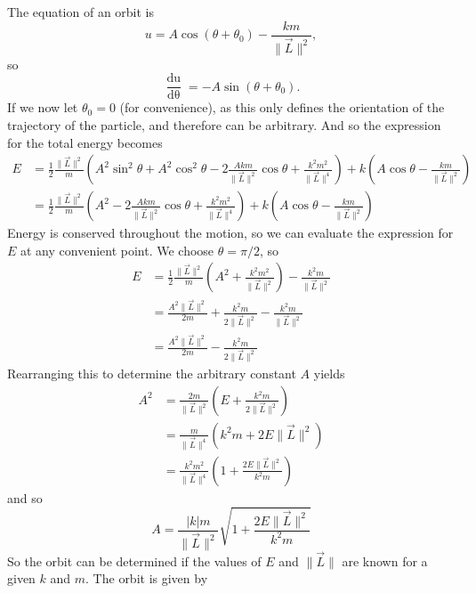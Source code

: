 \noindent The equation of an orbit is 
\begin{equation*}
    u = A \cos (\theta + \theta_0) - \frac{km}{\| \vec{L} \|^2},
\end{equation*}
so 
\begin{equation}
    \frac{\mathop{\mathrm{d}u}}{\mathop{\mathrm{d}\theta}} = -A\sin (\theta + \theta_0).
\end{equation}
If we now let $\theta_0 = 0$ (for convenience), as this only defines the orientation of the trajectory of the particle, and therefore can be arbitrary. And so the expression for the total energy becomes
\begin{align}
    E &= \frac{1}{2} \frac{\| \vec{L} \|^2}{m} \left(A^2 \sin^2 \theta + A^2 \cos^2 \theta - 2 \frac{Akm}{\| \vec{L} \|^2}\cos \theta + \frac{k^2 m^2}{\| \vec{L} \|^4} \right) + k\left(A \cos \theta - \frac{km}{\| \vec{L} \|^2}\right) \\ 
    &= \frac{1}{2} \frac{\| \vec{L} \|^2}{m} \left(A^2 - 2 \frac{Akm}{\| \vec{L} \|^2}\cos \theta + \frac{k^2 m^2}{\| \vec{L} \|^4} \right) + k\left(A \cos \theta - \frac{km}{\| \vec{L} \|^2}\right)
\end{align}
Energy is conserved throughout the motion, so we can evaluate the expression for $E$ at any convenient point. We choose $\theta = \pi/2$, so
\begin{align}
    E &= \frac{1}{2} \frac{\| \vec{L} \|^2}{m} \left(A^2 + \frac{k^2 m^2}{\| \vec{L} \|^2}\right) - \frac{k^2m}{\| \vec{L} \|^2} \\ 
    &= \frac{A^2 \| \vec{L} \|^2}{2m} + \frac{k^2 m}{2 \| \vec{L} \|^2} - \frac{k^2m}{\| \vec{L}\|^2} \\
    &= \frac{A^2 \| \vec{L} \|^2}{2m} - \frac{k^2 m}{2 \| \vec{L} \|^2}
\end{align}
Rearranging this to determine the arbitrary constant $A$ yields
\begin{align}
    A^2 &= \frac{2m}{\| \vec{L} \|^2} \left(E + \frac{k^2m}{2 \| \vec{L} \|^2}\right) \\
    &= \frac{m}{\| \vec{L} \|^4} \left(k^2 m + 2 E \| \vec{L} \|^2\right) \\
    &= \frac{k^2 m^2}{\| \vec{L} \|^4} \left(1 + \frac{2E\|\vec{L}\|^2}{k^2m}\right)
\end{align}
and so
\begin{equation}
    A = \frac{\left|k\right|m}{\| \vec{L} \|^2} \sqrt{1 + \frac{2 E \| \vec{L} \|^2}{k^2m}}
\end{equation}
So the orbit can be determined if the values of $E$ and $\| \vec{L}\|$ are known for a given $k$ and $m$. The orbit is given by
